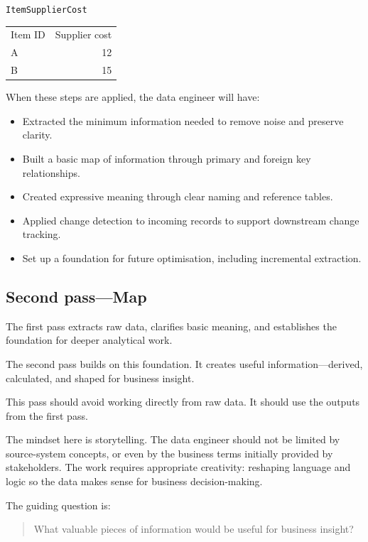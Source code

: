 \documentclass[10pt,openany,10pt]{book}
\providecommand{\tightlist}{%
  \setlength{\itemsep}{0pt}\setlength{\parskip}{0pt}}
\newcounter{none}
\let\podeToprule\toprule
\let\podeMidrule\midrule
\let\podeBottomrule\bottomrule
\renewcommand{\toprule}{\arrayrulecolor{pbiGrid}\podeToprule}
\renewcommand{\midrule}{\arrayrulecolor{pbiGrid}\podeMidrule}
\renewcommand{\bottomrule}{\arrayrulecolor{pbiGrid}\podeBottomrule}
\begin{document}
\texttt{ItemSupplierCost}

{\def\LTcaptype{none} %
\begin{longtable}[]{@{}lr@{}}
\toprule\noalign{}
Item ID & Supplier cost \\
\midrule\noalign{}
\endhead
\bottomrule\noalign{}
\endlastfoot
A & 12 \\
B & 15 \\
\end{longtable}
}

When these steps are applied, the data engineer will have:

\begin{itemize}
\tightlist
\item
  Extracted the minimum information needed to remove noise and preserve
  clarity.
\item
  Built a basic map of information through primary and foreign key
  relationships.
\item
  Created expressive meaning through clear naming and reference tables.
\item
  Applied change detection to incoming records to support downstream
  change tracking.
\item
  Set up a foundation for future optimisation, including incremental
  extraction.
\end{itemize}

\subsection{Second pass---Map}\label{second-passmap}

The first pass extracts raw data, clarifies basic meaning, and
establishes the foundation for deeper analytical work.

The second pass builds on this foundation. It creates useful
information---derived, calculated, and shaped for business insight.

This pass should avoid working directly from raw data. It should use the
outputs from the first pass.

The mindset here is storytelling. The data engineer should not be
limited by source-system concepts, or even by the business terms
initially provided by stakeholders. The work requires appropriate
creativity: reshaping language and logic so the data makes sense for
business decision-making.

The guiding question is:

\begin{quote}
What valuable pieces of information would be useful for business
insight?
\end{quote}
\end{document}
